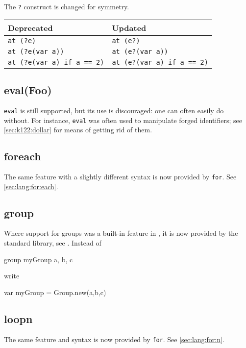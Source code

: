 The \lstinline{?} construct is changed for symmetry.

\begin{center}
  \begin{tabular}{|l|l|}
    \hline
    \textbf{Deprecated} & \textbf{Updated}  \\
    \hline
    \lstinline|at (?e)|                  & \lstinline|at (e?)|\\
    \lstinline|at (?e(var a))|           & \lstinline|at (e?(var a))|\\
    \lstinline|at (?e(var a) if a == 2)| & \lstinline|at (e?(var a) if a == 2)|\\
    \hline
  \end{tabular}
\end{center}


\subsection{eval(Foo)}
\lstinline{eval} is still supported, but its use is discouraged: one
can often easily do without.  For instance, \lstinline{eval} was often
used to manipulate forged identifiers; see \autoref{sec:k122:dollar}
for means of getting rid of them.

\subsection{foreach}
The same feature with a slightly different syntax is now provided by
\lstinline|for|.  See \autoref{sec:lang:for:each}.

\subsection{group}
Where support for groups was a built-in feature in , it is now
provided by the standard library, see .  Instead of
\begin{urbifixme}
group myGroup {a, b, c}
\end{urbifixme}
\noindent
write
\begin{urbifixme}
var myGroup = Group.new(a,b,c)
\end{urbifixme}

\subsection{loopn}
The same feature and syntax is now provided by \lstinline|for|.  See
\autoref{sec:lang:for:n}.

